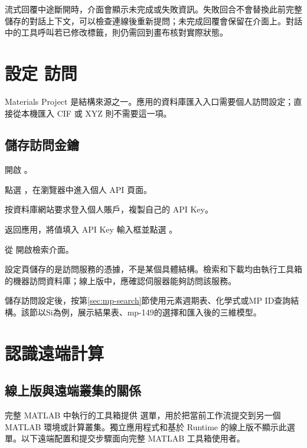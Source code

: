 流式回覆中途斷開時，介面會顯示未完成或失敗資訊。失敗回合不會替換此前完整儲存的對話上下文，可以檢查連線後重新提問；未完成回覆會保留在介面上。對話中的工具呼叫若已修改標籤，則仍需回到畫布核對實際狀態。


\section{設定  訪問}

Materials Project 是結構來源之一。應用的資料庫匯入入口需要個人訪問設定；直接從本機匯入 CIF 或 XYZ 則不需要這一項。

\subsection{儲存訪問金鑰}

\begin{steps}
\item 開啟 。
\item 點選 ，在瀏覽器中進入個人 API 頁面。
\item 按資料庫網站要求登入個人賬戶，複製自己的 API Key。
\item 返回應用，將值填入 API Key 輸入框並點選 。
\item 從  開啟檢索介面。
\end{steps}

設定頁儲存的是訪問服務的憑據，不是某個具體結構。檢索和下載均由執行工具箱的機器訪問資料庫；線上版中，應確認伺服器能夠訪問該服務。

儲存訪問設定後，按第\ref{sec:mp-search}節使用元素週期表、化學式或MP ID查詢結構。該節以Si為例，展示結果表、mp-149的選擇和匯入後的三維模型。

\section{認識遠端計算}

\subsection{線上版與遠端叢集的關係}

完整 MATLAB\regmark{} 中執行的工具箱提供  選單，用於把當前工作流提交到另一個 MATLAB\regmark{} 環境或計算叢集。獨立應用程式和基於 Runtime 的線上版不顯示此選單。以下遠端配置和提交步驟面向完整 MATLAB\regmark{} 工具箱使用者。

